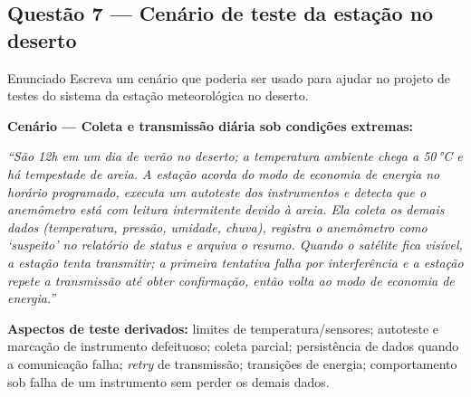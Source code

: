 \documentclass[11pt,a4paper]{article}
\begin{document}
\subsection*{Questão 7 — Cenário de teste da estação no deserto}
\begin{questao}{Enunciado}
Escreva um cenário que poderia ser usado para ajudar no projeto de testes do
sistema da estação meteorológica no deserto.
\end{questao}
\begin{resposta}
\textbf{Cenário — Coleta e transmissão diária sob condições extremas:}

\textit{“São 12h em um dia de verão no deserto; a temperatura ambiente chega a
50\,°C e há tempestade de areia. A estação acorda do modo de economia de energia
no horário programado, executa um autoteste dos instrumentos e detecta que o
anemômetro está com leitura intermitente devido à areia. Ela coleta os demais
dados (temperatura, pressão, umidade, chuva), registra o anemômetro como
‘suspeito’ no relatório de status e arquiva o resumo. Quando o satélite fica
visível, a estação tenta transmitir; a primeira tentativa falha por interferência
e a estação repete a transmissão até obter confirmação, então volta ao modo de
economia de energia.”}

\textbf{Aspectos de teste derivados:} limites de temperatura/sensores;
autoteste e marcação de instrumento defeituoso; coleta parcial; persistência de
dados quando a comunicação falha; \emph{retry} de transmissão; transições de
energia; comportamento sob falha de um instrumento sem perder os demais dados.
\end{resposta}

\end{document}
